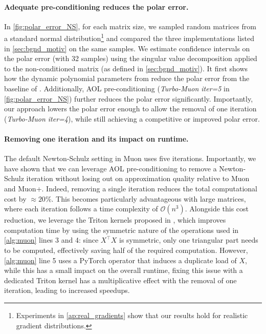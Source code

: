 \paragraph{Adequate pre-conditioning reduces the polar error.} 
In \cref{fig:polar_error_NS}, for each matrix size, we sampled random matrices from a standard normal distribution\footnote{Experiments in \cref{ap:real_gradients} show that our results hold for realistic gradient distributions.} and compared the three  implementations listed in \cref{sec:bgnd_motiv} on the same samples.
We estimate confidence intervals on the polar error (with 32 samples) 
using the singular value decomposition applied to the non-conditioned matrix (as defined in \cref{sec:bgnd_motiv}). It first 
shows how the dynamic polynomial parameters from \cite{ahn_dion_2025} reduce the polar error from the baseline of \cite{jordan2024muon}. Additionally, AOL pre-conditioning (\textit{Turbo-Muon iter=5} in \cref{fig:polar_error_NS}) further reduces the polar error significantly. 
Importantly, our approach lowers the polar error enough to allow the removal of one iteration
(\textit{Turbo-Muon iter=4}), while still achieving a competitive or improved polar error. 

\paragraph{Removing one iteration and its impact on runtime.}
The default Newton-Schulz setting in Muon uses five iterations. Importantly, we have shown that we can leverage AOL pre-conditioning to remove a Newton-Schulz iteration without losing out on approximation quality relative to Muon and Muon+. Indeed, removing a single iteration reduces the total computational cost by $\approx 20\%$. This becomes particularly advantageous with large matrices, where each iteration follows a time complexity of $\mathcal{O}(n^3)$.
Alongside this cost reduction, we leverage the Triton kernels proposed in \cite{ahn_dion_2025, lin2025flash}, which improves computation time by using the symmetric nature of the operations used in 
\cref{alg:muon} lines 3 and 4:
since $X^\top X$ is symmetric, only one triangular part needs to be computed, effectively saving half of the required computation. However, 
\cref{alg:muon} line 5
uses a PyTorch operator that induces a duplicate load of $X$, while this has a small impact on the overall runtime, fixing this issue with a dedicated Triton kernel has a multiplicative effect with the removal of one iteration, leading to increased speedups.

